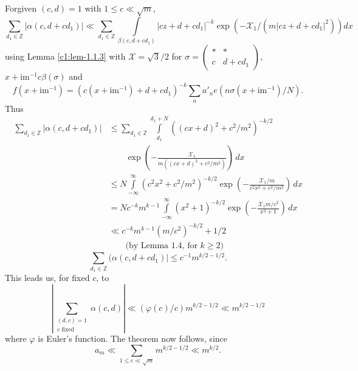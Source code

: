 \begin{proofoftheorem}\label{c1:proofofthm-1.1.1}
For\pageoriginale given $(c,d)=1$ with $1\leq c\ll\sqrt{m}$,
{\fontsize{10}{12}\selectfont
$$
\sum_{d_{1}\in\mathbb{Z}}|\alpha(c,d+cd_{1})|\ll
\sum_{d_{1}\in\mathbb{Z}}\int\limits_{\beta(c,d+cd_{1})}|cz+d+cd_{1}|^{-k}\exp(-\mathscr{X}_{1}/(m|cz+d+cd_{1}|^{2}))dx  
$$}\relax
using Lemma \ref{c1:lem-1.1.3} with $\mathscr{X}=\sqrt{3}/2$ for
$\sigma=\left(\begin{smallmatrix} \ast &\ast\\ c & d+cd_{1}
\end{smallmatrix}\right)$, $x+\text{im}^{-1}c\beta(\sigma)$ and 
$$
f(x+\text{im}^{-1})=(c(x+\text{im}^{-1})+d+cd_{1})^{-k}\sum_{n}a'_{n}e(n\sigma(x+\text{im}^{-1})/N).
$$
Thus
\begin{align*}
\sum_{d_{1}\in\mathbb{Z}}|\alpha(c,d+cd_{1})| &\leq
\sum_{d_{1}\in\mathbb{Z}}\int\limits^{d_{1}+N}_{d_{1}}((cx+d)^{2}+c^{2}/m^{2})^{-k/2}\\
&\qquad\exp\left(-\frac{\mathscr{X}_{1}}{m((cx+d)^{2}+c^{2}/m^{2})}\right)\,dx\\
&\leq N\int\limits^{\infty}_{-\infty}(c^{2}x^{2}+c^{2}/m^{2})^{-k/2}
\exp\left(-\frac{\mathscr{X}_{1}/m}{c^{2}x^{2}+c^{2}/m^{2}}\right)\,dx\\
&= Nc^{-k}m^{k-1}\int\limits^{\infty}_{-\infty}(x^{2}+1)^{-k/2}\exp
\left(-\frac{\mathscr{X}_{1}m/c^{2}}{x^{2}+1}\right)\,dx\\
&\ll c^{-k}m^{k-1}(m/c^{2})^{-k/2}+1/2\\
&\qquad\text{(by Lemma 1.4, for  $k\geq 2$)}
\end{align*}
\ie 
$$
\sum\limits_{d_{1}\in\mathbb{Z}}(\alpha(c,d+cd_{1})|\leq
c^{-1}m^{k/2-1/2}.
$$
This leads us, for fixed $c$, to 
$$
|\sum_{\substack{(d,c)=1\\ c\text{ fixed}}}\alpha(c,d)|\ll
(\varphi(c)/c)m^{k/2-1/2}\ll m^{k/2-1/2}
$$
where $\varphi$ is Euler's function. The theorem now follows, since
$$
a_{m}\ll \sum_{1\leq c\ll \sqrt{m}}m^{k/2-1/2}\ll m^{k/2}.
$$
\end{proofoftheorem}

